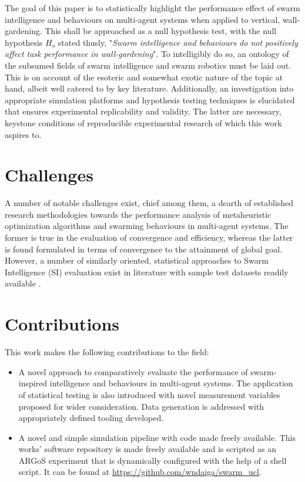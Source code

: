 \documentclass{report}
\begin{document}
The goal of this paper is to statistically highlight the performance effect of swarm intelligence and behaviours on multi-agent systems when applied to vertical, wall-gardening. This shall be approached as a null hypothesis test, with the null hypothesis $H_o$ stated thusly, "\textit{Swarm intelligence and behaviours do not positively affect task performance in wall-gardening}". To intelligibly do so, an ontology of the subsumed fields of swarm intelligence and swarm robotics must be laid out. This is on account of the esoteric and somewhat exotic nature of the topic at hand, albeit well catered to by key literature. Additionally, an investigation into appropriate simulation platforms and hypothesis testing techniques is elucidated that ensures experimental replicability and validity. The latter are necessary, keystone conditions of reproducible experimental research of which this work aspires to.

\section{Challenges}
A number of notable challenges exist, chief among them, a dearth of established research methodologies towards the performance analysis of metaheuristic optimization algorithms \cite{Yang2011} and swarming behaviours in multi-agent systems. The former is true in the evaluation of convergence and efficiency, whereas the latter is found formulated in terms of convergence to the attainment of global goal.
However, a number of similarly oriented, statistical approaches to Swarm Intelligence (SI) evaluation exist in literature \cite{Selvi2010} \cite{Yang2011} with sample test datasets readily available \cite{Gerhard1991}.

\section{Contributions}
This work makes the following contributions to the field:

\begin{itemize}
	\item A novel approach to comparatively evaluate the performance of swarm-inspired intelligence and behaviours in multi-agent systems. The application of statistical testing is also introduced with novel measurement variables proposed for wider consideration. Data generation is addressed with appropriately defined tooling developed.
	\item A novel and simple simulation pipeline with code made freely available. This works' software repository is made freely available and is scripted as an ARGoS experiment that is dynamically configured with the help of a shell script. It can be found at \url{https://github.com/wndaiga/swarm_ucl}.
\end{itemize}
\end{document}
